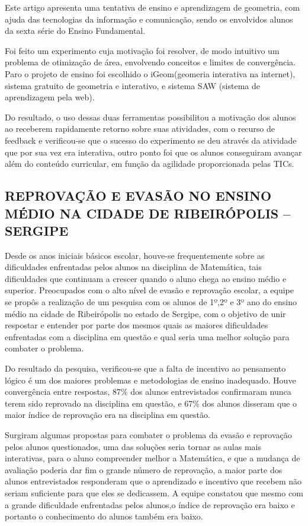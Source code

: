 \documentclass[12pt,a4paper]{article}
\begin{document}
Este artigo apresenta uma tentativa de ensino e aprendizagem de geometria, com ajuda das tecnologias da informação e comunicação, sendo os envolvidos alunos da sexta série do Ensino Fundamental. 

Foi feito um experimento cuja motivação foi resolver, de modo intuitivo um problema de otimização de área, envolvendo conceitos e limites de convergência. Paro o projeto de ensino foi escolhido o iGeom(geomeria interativa na internet), sistema gratuito de geometria e interativo, e sistema SAW (sistema de aprendizagem pela web).

Do resultado, o uso dessas duas ferramentas possibilitou a motivação dos alunos ao receberem rapidamente retorno sobre suas atividades, com o recurso de feedback e verificou-se que o sucesso do experimento se deu através da atividade que por sua vez era interativa, outro ponto foi que os alunos conseguiram avançar além do conteúdo curricular, em função da agilidade proporcionada pelas TICs. \citep{tanbellini2010uso} 

\subsection{REPROVAÇÃO E EVASÃO NO ENSINO MÉDIO NA CIDADE DE  RIBEIRÓPOLIS – SERGIPE}
Desde os anos iniciais básicos escolar, houve-se frequentemente sobre as dificuldades enfrentadas pelos alunos na disciplina de Matemática, tais dificuldades que continuam a crescer quando o aluno chega ao ensino médio e superior. Preocupados com o alto nível de evasão e reprovação escolar, a equipe se propôs a realização de um pesquisa com os alunos de 1º,2º e 3º ano do ensino médio na cidade de Ribeirópolis no estado de Sergipe, com o objetivo de unir respostar e entender por parte dos mesmos quais as maiores dificuldades enfrentadas com a disciplina em questão e qual seria uma melhor solução para combater o problema.

Do resultado da pesquisa, verificou-se que a falta de incentivo ao pensamento lógico é um dos maiores problemas e metodologias de ensino inadequado. Houve convergência entre respostas, 87\% dos alunos entrevistados confirmaram nunca terem sido reprovado na disciplina em questão, e 67\% dos alunos disseram que o maior índice de reprovação era na disciplina em questão. 

Surgiram algumas propostas para combater o problema da evasão e reprovação pelos alunos questionados, uma das soluções seria tornar as aulas mais interativas, para o aluno compreender melhor a Matemática, e que a mudança de avaliação poderia dar fim o grande número de reprovação, a maior parte dos alunos entrevistados responderam que o aprendizado e incentivo que recebem não seriam suficiente para que eles se dedicassem. 
A equipe constatou que mesmo com a grande dificuldade enfrentadas pelos alunos,o índice de reprovação era baixo e portanto o conhecimento do alunos também era baixo. \citep{santosreprovaccao}
\end{document}
